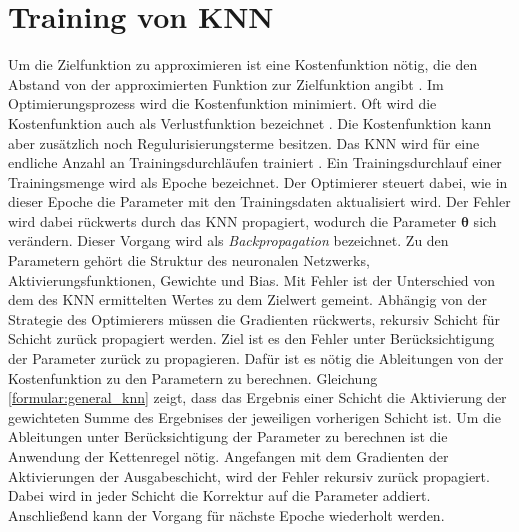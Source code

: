 \section{Training von KNN}
Um die Zielfunktion zu approximieren ist eine Kostenfunktion nötig, die den Abstand von der approximierten Funktion zur Zielfunktion angibt \cite{nielsenneural}.
Im Optimierungsprozess wird die Kostenfunktion minimiert. Oft wird die Kostenfunktion auch als Verlustfunktion bezeichnet \cite{bengio2017deep}.
Die Kostenfunktion kann aber zusätzlich noch Regulurisierungsterme besitzen.
\newline
\newline
Das KNN wird für eine endliche Anzahl an Trainingsdurchläufen trainiert \cite{nielsenneural}.
Ein Trainingsdurchlauf einer Trainingsmenge wird als Epoche bezeichnet.
Der Optimierer steuert dabei, wie in dieser Epoche die Parameter mit den Trainingsdaten aktualisiert wird.
Der Fehler wird dabei rückwerts durch das KNN propagiert, wodurch die Parameter $\boldsymbol\theta$ sich verändern.
Dieser Vorgang wird als \textit{Backpropagation} bezeichnet.
Zu den Parametern gehört die Struktur des neuronalen Netzwerks, Aktivierungsfunktionen, Gewichte und Bias.
Mit Fehler ist der Unterschied von dem des KNN ermittelten Wertes zu dem Zielwert gemeint.
\newline
\newline
Abhängig von der Strategie des Optimierers müssen die Gradienten rückwerts, rekursiv Schicht für Schicht zurück propagiert werden.
Ziel ist es den Fehler unter Berücksichtigung der Parameter zurück zu propagieren.
Dafür ist es nötig die Ableitungen von der Kostenfunktion zu den Parametern zu berechnen.
Gleichung \ref{formular:general_knn} zeigt, dass das Ergebnis einer Schicht die Aktivierung der gewichteten Summe des
Ergebnises der jeweiligen vorherigen Schicht ist.
Um die Ableitungen unter Berücksichtigung der Parameter zu berechnen ist die Anwendung der Kettenregel nötig.
\newline
\newline
Angefangen mit dem Gradienten der Aktivierungen der Ausgabeschicht, wird der Fehler rekursiv zurück propagiert.
Dabei wird in jeder Schicht die Korrektur auf die Parameter addiert.
Anschließend kann der Vorgang für nächste Epoche wiederholt werden.